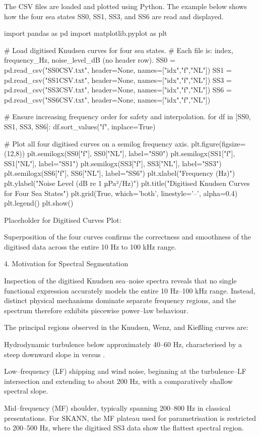 \documentclass[12pt]{article}
\begin{document}
The CSV files are loaded and plotted using Python. The example below shows how the four sea states SS0, SS1, SS3, and SS6 are read and displayed.

import pandas as pd
import matplotlib.pyplot as plt

\# Load digitised Knudsen curves for four sea states.
\# Each file is: index, frequency_Hz, noise_level_dB (no header row).
SS0 = pd.read_csv("SS0CSV.txt", header=None, names=["idx","f","NL"])
SS1 = pd.read_csv("SS1CSV.txt", header=None, names=["idx","f","NL"])
SS3 = pd.read_csv("SS3CSV.txt", header=None, names=["idx","f","NL"])
SS6 = pd.read_csv("SS6CSV.txt", header=None, names=["idx","f","NL"])

\# Ensure increasing frequency order for safety and interpolation.
for df in [SS0, SS1, SS3, SS6]:
    df.sort_values("f", inplace=True)

\# Plot all four digitised curves on a semilog frequency axis.
plt.figure(figsize=(12,8))
plt.semilogx(SS0["f"], SS0["NL"], label="SS0")
plt.semilogx(SS1["f"], SS1["NL"], label="SS1")
plt.semilogx(SS3["f"], SS3["NL"], label="SS3")
plt.semilogx(SS6["f"], SS6["NL"], label="SS6")
plt.xlabel("Frequency (Hz)")
plt.ylabel("Noise Level (dB re 1 µPa²/Hz)")
plt.title("Digitised Knudsen Curves for Four Sea States")
plt.grid(True, which='both', linestyle='--', alpha=0.4)
plt.legend()
plt.show()

Placeholder for Digitised Curves Plot:

Superposition of the four curves confirms the correctness and smoothness of the digitised data across the entire 10 Hz to 100 kHz range.

4. Motivation for Spectral Segmentation

Inspection of the digitised Knudsen sea–noise spectra reveals that no single functional expression accurately models the entire 10 Hz–100 kHz range. Instead, distinct physical mechanisms dominate separate frequency regions, and the spectrum therefore exhibits piecewise power–law behaviour.

The principal regions observed in the Knudsen, Wenz, and Kießling curves are:

Hydrodynamic turbulence below approximately 40–60 Hz, characterised by a steep downward slope in  versus .

Low–frequency (LF) shipping and wind noise, beginning at the turbulence–LF intersection  and extending to about 200 Hz, with a comparatively shallow spectral slope.

Mid–frequency (MF) shoulder, typically spanning 200–800 Hz in classical presentations. For SKANN, the MF plateau used for parametrisation is restricted to 200–500 Hz, where the digitised SS3 data show the flattest spectral region.
\end{document}
